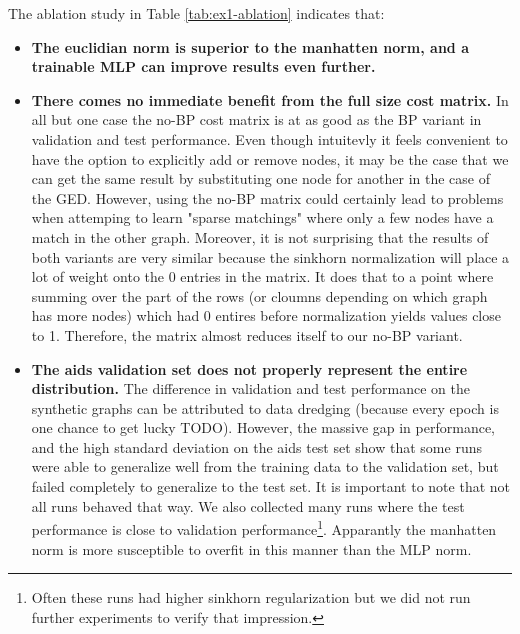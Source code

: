 The ablation study in Table \ref{tab:ex1-ablation} indicates that:
\begin{itemize}
    \itemsep0em
    \item \textbf{The euclidian norm is superior to the manhatten norm, and a trainable MLP can improve results even further.}
    \item \textbf{There comes no immediate benefit from the full size cost matrix.} In all but one case the no-BP cost matrix is at as good as the BP variant in validation and test performance. Even though intuitevly it feels convenient to have the option to explicitly add or remove nodes, it may be the case that we can get the same result by substituting one node for another in the case of the GED. However, using the no-BP matrix could certainly lead to problems when attemping to learn "sparse matchings" where only a few nodes have a match in the other graph. Moreover, it is not surprising that the results of both variants are very similar because the sinkhorn normalization will place a lot of weight onto the 0 entries in the matrix. It does that to a point where summing over the part of the rows (or cloumns depending on which graph has more nodes) which had 0 entires before normalization yields values close to 1. Therefore, the matrix almost reduces itself to our no-BP variant.
    \item \textbf{The aids validation set does not properly represent the entire distribution.} The difference in validation and test performance on the synthetic graphs can be attributed to data dredging (because every epoch is one chance to get lucky TODO). However, the massive gap in performance, and the high standard deviation on the aids test set show that some runs were able to generalize well from the training data to the validation set, but failed completely to generalize to the test set. It is important to note that not all runs behaved that way. We also collected many runs where the test performance is close to validation performance\footnote{Often these runs had higher sinkhorn regularization but we did not run further experiments to verify that impression.}. Apparantly the manhatten norm is more susceptible to overfit in this manner than the MLP norm.
\end{itemize}


